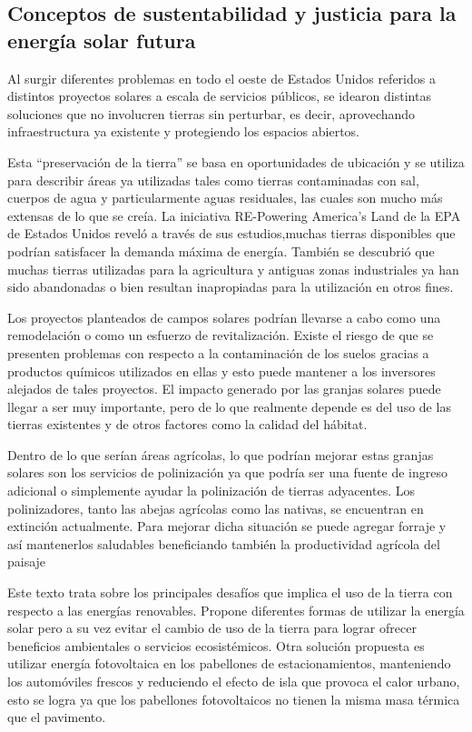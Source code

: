 \documentclass[runningheads]{llncs}
\begin{document}
\subsection*{Conceptos de sustentabilidad y justicia para la energía solar futura}
Al surgir diferentes problemas en todo el oeste de Estados Unidos referidos a distintos proyectos solares a escala de servicios públicos, se idearon distintas soluciones que no involucren tierras sin perturbar, es decir, aprovechando infraestructura ya existente y protegiendo los espacios abiertos.\\ \par
Esta “preservación de la tierra” se basa en oportunidades de ubicación y se utiliza para describir áreas ya utilizadas tales como tierras contaminadas con sal, cuerpos de agua y particularmente aguas residuales, las cuales son mucho más extensas de lo que se creía. La iniciativa RE-Powering America's Land de la EPA de Estados Unidos reveló a través de sus estudios,muchas tierras disponibles que  podrían satisfacer la demanda máxima de energía. También se descubrió que muchas tierras utilizadas para la agricultura y antiguas zonas industriales ya han sido abandonadas o bien resultan inapropiadas para la utilización en otros fines.\\ \par
Los proyectos planteados de campos solares podrían llevarse a cabo como una remodelación o como un esfuerzo de revitalización. Existe el riesgo de que se presenten problemas con respecto a la contaminación de los suelos gracias a productos químicos utilizados en ellas y esto puede mantener a los inversores alejados de tales proyectos. El impacto generado por las granjas solares puede llegar a ser muy importante, pero de lo que realmente depende es del uso de las tierras existentes y de otros factores como la calidad del hábitat.\\ \par
Dentro de lo que serían áreas agrícolas, lo que podrían mejorar estas granjas solares son los servicios de polinización ya que podría ser una fuente de ingreso adicional o simplemente ayudar la polinización de tierras adyacentes. Los polinizadores, tanto las abejas agrícolas como las nativas, se encuentran en extinción actualmente. Para mejorar dicha situación se puede agregar forraje y así mantenerlos saludables beneficiando también la productividad agrícola del paisaje\\ \par
Este texto trata sobre los principales desafíos que implica el uso de la tierra con respecto a las energías renovables. Propone diferentes formas de utilizar la energía solar pero a su vez evitar el cambio de uso de la tierra para lograr ofrecer beneficios ambientales o servicios ecosistémicos. Otra solución propuesta es utilizar energía fotovoltaica en los pabellones de estacionamientos, manteniendo los automóviles frescos y reduciendo el efecto de isla que provoca el calor urbano, esto se logra ya que los pabellones fotovoltaicos no tienen la misma masa térmica que el pavimento.
\end{document}
